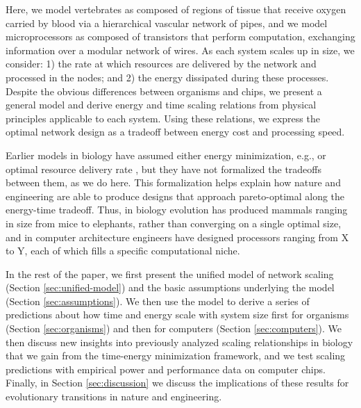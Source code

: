 \documentclass[12pt]{article}
\begin{document}
Here, we model vertebrates as composed of regions of tissue that 
receive oxygen carried by blood via a hierarchical vascular network of pipes, and we 
model microprocessors as composed of transistors that perform 
computation, exchanging information over a modular network of wires.  
As each system scales up in size, we consider: 1) the rate at which 
resources are delivered by the network and processed in the nodes; 
and 2) the energy dissipated during these processes. Despite the 
obvious differences between organisms and chips, we present a general
model and derive 
energy and time scaling relations from physical principles applicable 
to each system. Using these relations, we express the optimal network 
design as a tradeoff between energy cost and processing speed. 


Earlier models in biology have assumed either energy minimization, e.g., \cite{west97} or optimal resource
delivery rate \cite{banavar10}, but they have not formalized the
tradeoffs between them, as we do here.  This formalization helps
explain how  nature and engineering are able to produce designs that
approach pareto-optimal along the 
energy-time tradeoff.
Thus, in
biology evolution has produced mammals ranging in size from mice to
elephants, rather than converging on a single optimal size, and in computer architecture engineers have designed
processors ranging from X to Y, each of which fills a specific
computational niche.

In the rest of the paper, we first present the unified model of network
scaling (Section \ref{sec:unified-model}) and the basic assumptions underlying
the model (Section \ref{sec:assumptions}).  We then use the model to derive a series of predictions about how time and energy scale with system size first for 
organisms (Section \ref{sec:organisms}) and then for computers (Section
\ref{sec:computers}). We then discuss new insights into previously analyzed scaling relationships in biology that we gain from the time-energy minimization framework, and we test scaling predictions with empirical power and performance data on computer chips.  Finally, in Section
  \ref{sec:discussion}  we discuss
  the implications of these results for evolutionary transitions in
  nature and engineering.
\end{document}
